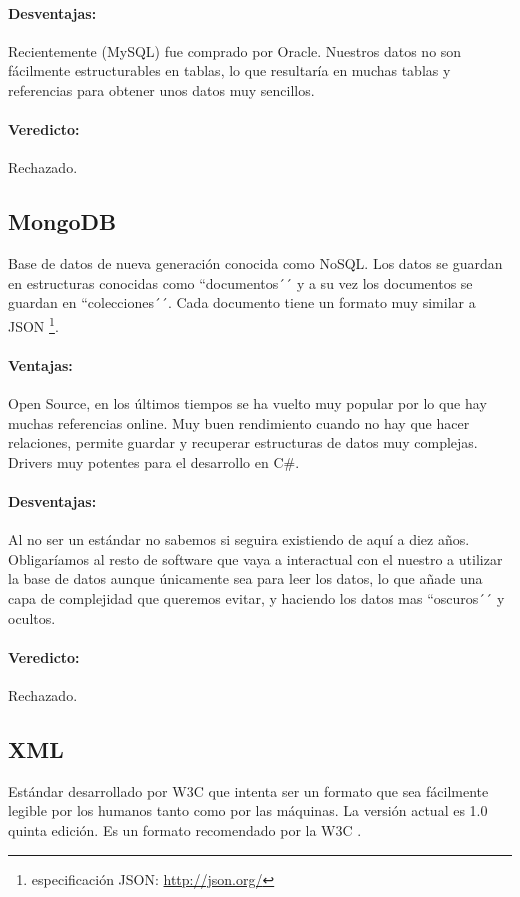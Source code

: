\paragraph{Desventajas:} Recientemente (MySQL) fue comprado por Oracle. Nuestros datos no son f\'{a}cilmente estructurables en tablas, lo
que resultar\'{i}a en muchas tablas y referencias para obtener unos datos muy sencillos.

\paragraph{Veredicto:} Rechazado.

\subsection{MongoDB}
Base de datos de nueva generaci\'{o}n conocida como NoSQL. Los datos se guardan en estructuras conocidas como ``documentos´´ y a su vez los
documentos se guardan en ``colecciones´´. Cada documento tiene un formato muy similar a JSON 
\footnote{especificaci\'{o}n JSON: \url{http://json.org/}}.

\paragraph{Ventajas:} Open Source, en los \'{u}ltimos tiempos se ha vuelto muy popular por lo que hay muchas referencias
online. Muy buen rendimiento cuando no hay que hacer relaciones, permite guardar y recuperar estructuras de datos muy complejas. Drivers
muy potentes para el desarrollo en C\#.

\paragraph{Desventajas:} Al no ser un est\'{a}ndar no sabemos si seguira existiendo de aqu\'{i} a diez a\~{n}os. Obligar\'{i}amos
al resto de software que vaya a interactual con el nuestro a utilizar la base de datos aunque \'{u}nicamente sea para leer los datos,
lo que a\~{n}ade una capa de complejidad que queremos evitar, y haciendo los datos mas ``oscuros´´ y ocultos.

\paragraph{Veredicto:} Rechazado.

\subsection{XML}
Est\'{a}ndar desarrollado por W3C que intenta ser un formato que sea f\'{a}cilmente legible por los humanos tanto como por las m\'{a}quinas. La
versi\'{o}n actual es 1.0 quinta edici\'{o}n. Es un formato recomendado por la W3C \cite{XML:Specification}.

